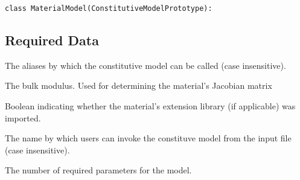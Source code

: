 \documentclass[letterpaper,10pt,english]{sphinxmanual}
\begin{document}
\begin{Verbatim}[commandchars=\\\{\}]
class MaterialModel(ConstitutiveModelPrototype):
\end{Verbatim}


\subsection{Required Data}
\label{Files/installing_materials:required-data}

\begin{fulllineitems}
\label{Files/installing_materials:MaterialModel.aliases}
The aliases by which the constitutive model can be called (case insensitive).

\end{fulllineitems}


\begin{fulllineitems}
\label{Files/installing_materials:MaterialModel.bulk_modulus}
The bulk modulus.  Used for determining the material's Jacobian matrix

\end{fulllineitems}


\begin{fulllineitems}
\label{Files/installing_materials:MaterialModel.imported}
Boolean indicating whether the material's extension library (if applicable)
was imported.

\end{fulllineitems}


\begin{fulllineitems}
\label{Files/installing_materials:MaterialModel.name}
The name by which users can invoke the constituve model from the input file
(case insensitive).

\end{fulllineitems}


\begin{fulllineitems}
\label{Files/installing_materials:MaterialModel.nprop}
The number of required parameters for the model.

\end{fulllineitems}
\end{document}
